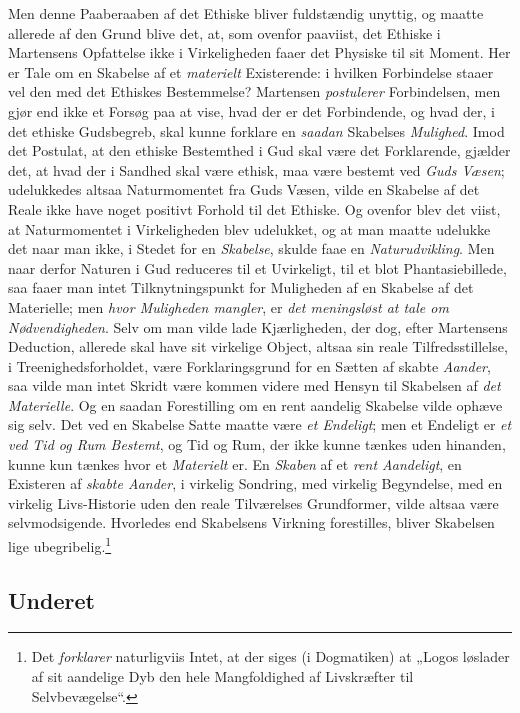 \documentclass[12pt,a4paper]{book}
\newcommand{\opage}[1]{\marginnote{\footnotesize\textit{[#1]}}}
\begin{document}
Men denne Paaberaaben af det Ethiske bliver fuldstændig unyttig, og maatte allerede
af den Grund blive det, at, som ovenfor paaviist, det Ethiske i Martensens Opfattelse
ikke i Virkeligheden faaer det Physiske til sit Moment. Her \opage{78}er Tale om en Skabelse af et \emph{materielt} Existerende: i hvilken Forbindelse staaer vel den med det Ethiskes
Bestemmelse? Martensen \emph{postulerer} Forbindelsen, men gjør end ikke et Forsøg paa at
vise, hvad der er det Forbindende, og hvad der, i det ethiske Gudsbegreb, skal kunne
forklare en \emph{saadan} Skabelses \emph{Mulighed}. Imod det Postulat, at den ethiske Bestemthed
i Gud skal være det Forklarende, gjælder det, at hvad der i Sandhed skal være ethisk,
maa være bestemt ved \emph{Guds Væsen}; udelukkedes altsaa Naturmomentet fra Guds Væsen,
vilde en Skabelse af det Reale ikke have noget positivt Forhold til det Ethiske. Og
ovenfor blev det viist, at Naturmomentet i Virkeligheden blev udelukket, og at man maatte
udelukke det naar man ikke, i Stedet for en \emph{Skabelse}, skulde faae en \emph{Naturudvikling}.
Men naar derfor Naturen i Gud reduceres til et Uvirkeligt, til et blot
Phantasiebillede, saa faaer man intet Tilknytningspunkt for Muligheden af en Skabelse
af det Materielle; men \emph{hvor Muligheden mangler}, er \emph{det meningsløst at tale om Nødvendigheden}. Selv om man vilde lade Kjærligheden, der dog, efter Martensens
Deduction, allerede skal have sit virkelige Object, altsaa sin reale
Tilfredsstillelse, i Treenighedsforholdet, være Forklaringsgrund for en Sætten af
skabte \emph{Aander}, saa vilde man intet Skridt være kommen videre med Hensyn til
Skabelsen af \emph{det Materielle}. Og en saadan Forestilling om en rent aandelig Skabelse
vilde ophæve sig selv. Det ved en Skabelse Satte maatte være \emph{et Endeligt}; men et
Endeligt er \emph{et ved Tid og Rum Bestemt}, og Tid og Rum, der ikke kunne tænkes uden
hinanden, kunne kun tænkes hvor et \emph{Materielt} er. En \emph{Skaben} af et \emph{rent Aandeligt}, en
Existeren af \emph{skabte Aander}, i virkelig Sondring, med virkelig Begyndelse, med en
virkelig Livs-Historie uden den reale Tilværelses Grundformer, vilde altsaa være
selvmodsigende. Hvorledes end Skabelsens Virkning forestilles, bliver Skabelsen lige
ubegribelig.\footnote{Det \emph{forklarer} naturligviis Intet, at der siges (i Dogmatiken)
at „Logos løslader af sit aandelige Dyb den hele Mangfoldighed af Livskræfter til
Selvbevægelse“.}

\subsection{Underet}
\label{ssec:underet}
\end{document}

